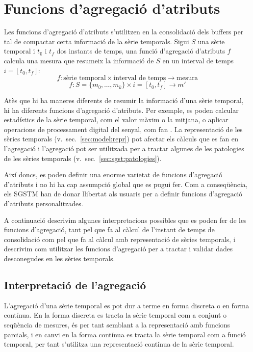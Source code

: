
\section{Funcions d'agregació d'atributs}
\label{sec:model:interpolador}
\label{sec:model:agregador}


Les funcions d'agregació d'atributs s'utilitzen en la consolidació
dels buffers per tal de compactar certa informació de la sèrie
temporals. Sigui $S$ una sèrie temporal i $t_0$ i $t_f$ dos instants
de temps, una funció d'agregació d'atributs $f$ calcula una mesura que
resumeix la informació de $S$ en un interval de temps $i=[t_0,t_f]$:
\[
f: \text{sèrie temporal} \times \text{interval de temps}
\longrightarrow \text{mesura}
\]
\[
f: S=\{m_0,\ldots,m_k\} \times i=[t_0,t_f] \longrightarrow  m'
\]


Atès que hi ha maneres diferents de resumir la informació d'una sèrie
temporal, hi ha diferents funcions d'agregació d'atributs. Per
exemple, es poden calcular estadístics de la sèrie temporal, com el
valor màxim o la mitjana, o aplicar operacions de processament digital
del senyal, com fan \textcite{zhang11}.  La representació de les
sèries temporals (v.\ sec.~\ref{sec:model:repr}) pot afectar els
càlculs que es fan en l'agregació i l'agregació pot ser utilitzada per
a tractar algunes de les patologies de les sèries temporals
(v.\ sec.~\ref{sec:sgst:patologies}).


Així doncs, es poden definir una enorme varietat de funcions
d'agregació d'atributs i no hi ha cap assumpció global que es pugui
fer. Com a conseqüència, els SGSTM han de donar llibertat als usuaris
per a definir funcions d'agregació d'atributs personalitzades.

A continuació descrivim algunes interpretacions possibles que es poden
fer de les funcions d'agregació, tant pel que fa al càlcul de
l'instant de temps de consolidació com pel que fa al càlcul amb
representació de sèries temporals, i descrivim com utilitzar les
funcions d'agregació per a tractar i validar dades desconegudes en les
sèries temporals.




\subsection{Interpretació de l'agregació}

L'agregació d'una sèrie temporal es pot dur a terme en forma discreta
o en forma contínua.  En la forma discreta es tracta la sèrie temporal
com a conjunt o seqüència de mesures, és per tant semblant a la
representació amb funcions parcials, i en canvi en la forma contínua
es tracta la sèrie temporal com a funció temporal, per tant s'utilitza
una representació contínua de la sèrie temporal.

